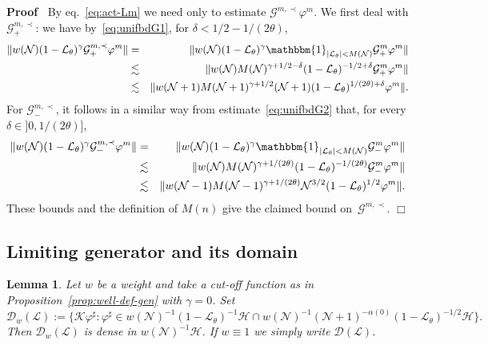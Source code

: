 \documentclass{article}
\newcommand{\assign}{:=}
\newenvironment{proof}{\noindent\textbf{Proof\ }}{\hspace*{\fill}$\Box$\medskip}
\newtheorem{lemma}{Lemma}
\begin{document}
\begin{proof}
  By eq.~{\eqref{eq:act-Lm}} we need only to estimate $\mathcal{G}^{m, \prec}
  \varphi^m$. We first deal with $\mathcal{G}_+^{m, \prec}$: we have
  by~{\eqref{eq:unifbdG1}}, for $\delta < 1 / 2 - 1 / (2 \theta)$,
  \begin{eqnarray*}
    \| w (\mathcal{N}) (1 -\mathcal{L}_{\theta})^{\gamma} \mathcal{G}_+^{m,
    \prec} \varphi^m \| & = & \| w (\mathcal{N}) (1
    -\mathcal{L}_{\theta})^{\gamma} \mathbbm{1}_{| \mathcal{L}_{\theta} | < M
    (\mathcal{N})} \mathcal{G}_+^m \varphi^m \|\\
    & \lesssim & \| w (\mathcal{N}) M (\mathcal{N})^{\gamma + 1 / 2 - \delta}
    (1 -\mathcal{L}_{\theta})^{- 1 / 2 + \delta} \mathcal{G}_+^m \varphi^m
    \|\\
    & \lesssim & \| w (\mathcal{N}+ 1) M (\mathcal{N}+ 1)^{\gamma + 1 / 2}
    (\mathcal{N}+ 1) (1 -\mathcal{L}_{\theta})^{1 / (2 \theta) + \delta}
    \varphi^m \| .
  \end{eqnarray*}
  For $\mathcal{G}_-^{m, \prec}$, it follows in a similar way from
  estimate~{\eqref{eq:unifbdG2}} that, for every $\delta \in] 0, 1 / (2
  \theta)]$,
  \begin{eqnarray*}
    \| w (\mathcal{N}) (1 -\mathcal{L}_{\theta})^{\gamma} \mathcal{G}_-^{m,
    \prec} \varphi^m \| & = & \| w (\mathcal{N}) (1
    -\mathcal{L}_{\theta})^{\gamma} \mathbbm{1}_{| \mathcal{L}_{\theta} | < M
    (\mathcal{N})} \mathcal{G}_-^m \varphi^m \|\\
    & \lesssim & \| w (\mathcal{N}) M (\mathcal{N})^{\gamma + 1 / (2 \theta)}
    (1 -\mathcal{L}_{\theta})^{- 1 / (2 \theta)} \mathcal{G}_-^m \varphi^m
    \|\\
    & \lesssim & \| w (\mathcal{N}- 1) M (\mathcal{N}- 1)^{\gamma + 1 / (2
    \theta)} \mathcal{N}^{3 / 2} (1 -\mathcal{L}_{\theta})^{1 / 2} \varphi^m
    \| .
  \end{eqnarray*}
  These bounds and the definition of $M (n)$ give the claimed bound
  on~$\mathcal{G}^{m, \prec}$.
\end{proof}

\subsection{Limiting generator and its domain}

\begin{lemma}
  \label{lem:density}Let $w$ be a weight and take a cut-off function as in
  Proposition~\ref{prop:well-def-gen} with $\gamma = 0$. Set
  \[ \mathcal{D}_w (\mathcal{L}) \assign \{ \mathcal{K} \varphi^{\sharp} :
     \varphi^{\sharp} \in w (\mathcal{N})^{- 1} (1 -\mathcal{L}_{\theta})^{-
     1} \mathcal{H} \cap w (\mathcal{N})^{- 1} (\mathcal{N}+ 1)^{- \alpha (0)}
     (1 -\mathcal{L}_{\theta})^{- 1 / 2} \mathcal{H} \} . \]
  Then $\mathcal{D}_w (\mathcal{L})$ is dense in $w (\mathcal{N})^{- 1}
  \mathcal{H}$. If $w \equiv 1$ we simply write $\mathcal{D} (\mathcal{L})$.
\end{lemma}
\end{document}
